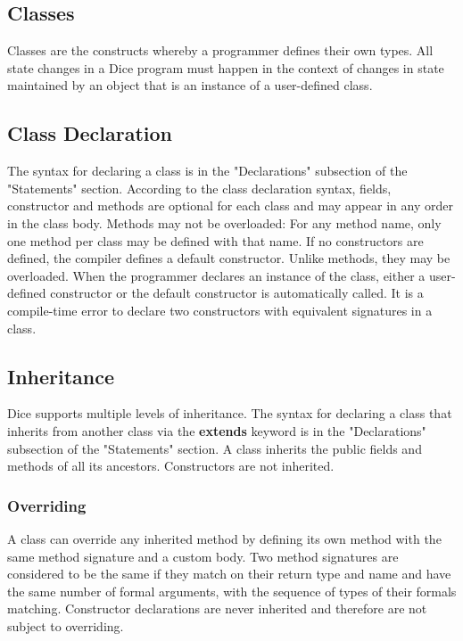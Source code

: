 \begin{homeworkProblem}
	\chapter{Classes}
	
	Classes are the constructs whereby a programmer defines their own types. All state changes in a Dice program must happen in the context of changes in state maintained by an object that is an instance of a user-defined class.

	\section{Class Declaration}
	The syntax for declaring a class is in the "Declarations" subsection of the "Statements" section. According to the class declaration syntax, fields, constructor and methods are optional for each class and may appear in any order in the class body. 
\newline
Methods may not be overloaded: For any method name, only one method per class may be defined with that name.
\newline
If no constructors are defined, the compiler defines a default constructor. Unlike methods, they may be overloaded. When the programmer declares an instance of the class, either a user-defined constructor or the default constructor is automatically called. It is a compile-time error to declare two constructors with equivalent signatures in a class.

	\section{Inheritance}
    Dice supports multiple levels of inheritance. The syntax for declaring a class that inherits from another class via the \textbf{extends} keyword is in the "Declarations" subsection of the "Statements" section. A class inherits the public fields and methods of all its ancestors. Constructors are not inherited.

	\subsection{Overriding}
A class can override any inherited method by defining its own method with the same method signature and a custom body. Two method signatures are considered to be the same if they match on their return type and name and have the same number of formal arguments, with the sequence of types of their formals matching. Constructor declarations are never inherited and therefore are not subject to overriding.


\end{homeworkProblem}
